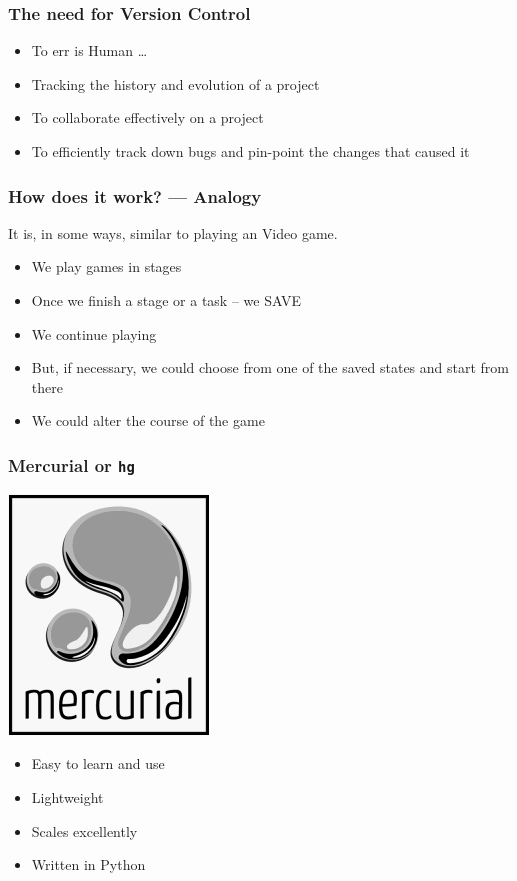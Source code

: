 \documentclass[14pt,compress]{beamer}
\newcommand{\typ}[1]{\lstinline{#1}}
\begin{document}
\begin{frame}[fragile]
  \frametitle{The need for Version Control}
  \begin{itemize}
  \item \alert{To err is Human} \ldots 
  \item Tracking the history and evolution of a project
  \item To collaborate effectively on a project
  \item To efficiently track down bugs and pin-point the changes that
    caused it 
  \end{itemize}
\end{frame}

\begin{frame}[fragile]
  \frametitle{How does it work? --- Analogy}
  It is, in some ways, similar to playing an Video game.
  \begin{itemize}
  \item We play games in stages
  \item Once we finish a stage or a task -- \alert{we SAVE}
  \item We continue playing
  \item But, if necessary, we could choose from one of the saved
    states and start from there
  \item We could alter the course of the game
  \end{itemize}
\end{frame}


\begin{frame}
  \frametitle{Mercurial or \typ{hg}}
  \begin{center}
    \includegraphics[height=.75in,interpolate=true]{../images/mercurial_logo}
  \end{center}
  \begin{itemize}
  \item Easy to learn and use
  \item Lightweight
  \item Scales excellently
  \item Written in Python
  \end{itemize}
\end{frame}
\end{document}
